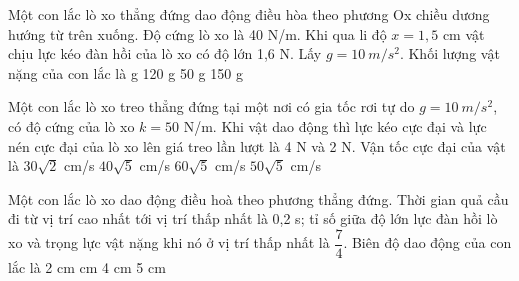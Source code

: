 \begin{ex}%
Một con lắc lò xo thẳng đứng dao động điều hòa theo phương Ox chiều dương hướng từ trên xuống. Độ cứng lò xo là 40 N/m. Khi qua li độ $x = 1,5$ cm vật chịu lực kéo đàn hồi của lò xo có độ lớn 1,6 N. Lấy $g = 10\ m/s^2$. Khối lượng vật nặng của con lắc là
\choice
{ g}
{120 g }
{50 g}
{150 g}
\end{ex} 
\begin{ex}%

Một con lắc lò xo treo thẳng đứng tại một nơi có gia tốc rơi tự do $g=10\ m/s^2$, có độ cứng của lò xo $k = 50$ N/m. Khi vật dao động thì lực kéo cực đại và lực nén cực đại của lò xo lên giá treo lần lượt là 4 N và 2 N. Vận tốc cực đại của vật là
\choice
{$30\sqrt2$ cm/s}
{$40\sqrt5$ cm/s}
{\True $60\sqrt5$ cm/s}
{$50\sqrt5$ cm/s}
\end{ex} 
\begin{ex}%
Một con lắc lò xo dao động điều hoà theo phương thẳng đứng. Thời gian quả cầu đi từ vị trí cao nhất tới vị trí thấp nhất là 0,2 s; tỉ số giữa độ lớn lực đàn hồi lò xo và trọng lực vật nặng khi nó ở vị trí thấp nhất là $\dfrac{7}{4}$. Biên độ dao động của con lắc là
\choice
{2 cm}
{ cm}
{4 cm}
{5 cm}
\end{ex} 
